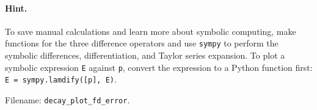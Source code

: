 \documentclass[graybox,sectrefs,envcountresetchap,open=right,final]{svmonodo}
\newenvironment{doconceexercise}{}{}
\begin{document}
\begin{doconceexercise}

\paragraph{Hint.}
To save manual calculations and learn more about symbolic computing,
make functions for the three difference operators and use \texttt{sympy}
to perform the symbolic differences, differentiation, and Taylor series
expansion. To plot a symbolic expression \texttt{E} against \texttt{p}, convert the
expression to a Python function first: \texttt{E = sympy.lamdify([p], E)}.


\noindent Filename: \Verb!decay_plot_fd_error!.

\end{doconceexercise}
\end{document}
